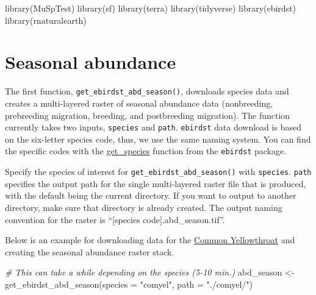 \documentclass[
]{book}
\newenvironment{Shaded}{\begin{snugshade}}{\end{snugshade}}
\newcommand{\AttributeTok}[1]{\textcolor[rgb]{0.77,0.63,0.00}{#1}}
\newcommand{\CommentTok}[1]{\textcolor[rgb]{0.56,0.35,0.01}{\textit{#1}}}
\newcommand{\FunctionTok}[1]{\textcolor[rgb]{0.00,0.00,0.00}{#1}}
\newcommand{\NormalTok}[1]{#1}
\newcommand{\OtherTok}[1]{\textcolor[rgb]{0.56,0.35,0.01}{#1}}
\newcommand{\StringTok}[1]{\textcolor[rgb]{0.31,0.60,0.02}{#1}}
\begin{document}
\begin{Shaded}
\begin{Highlighting}[]
\FunctionTok{library}\NormalTok{(MuSpTest)}
\FunctionTok{library}\NormalTok{(sf)}
\FunctionTok{library}\NormalTok{(terra)}
\FunctionTok{library}\NormalTok{(tidyverse)}
\FunctionTok{library}\NormalTok{(ebirdst)}
\FunctionTok{library}\NormalTok{(rnaturalearth)}
\end{Highlighting}
\end{Shaded}

\hypertarget{seasonal-abundance}{%
\section{Seasonal abundance}\label{seasonal-abundance}}

The first function, \texttt{get\_ebirdst\_abd\_season()}, downloads species data and creates a multi-layered raster of seasonal abundance data (nonbreeding, prebreeding migration, breeding, and postbreeding migration). The function currently takes two inputs, \texttt{species} and \texttt{path}. \texttt{ebirdst} data download is based on the six-letter species code, thus, we use the same naming system. You can find the specific codes with the \href{https://rdrr.io/github/CornellLabofOrnithology/ebirdst/man/get_species.html}{get\_species} function from the \texttt{ebirdst} package.

Specify the species of interest for \texttt{get\_ebirdst\_abd\_season()} with \texttt{species}. \texttt{path} specifies the output path for the single multi-layered raster file that is produced, with the default being the current directory. If you want to output to another directory, make sure that directory is already created. The output naming convention for the raster is ``{[}species code{]}.abd\_season.tif''.

Below is an example for downloading data for the \href{https://ebird.org/species/comyel}{Common Yellowthroat} and creating the seasonal abundance raster stack.

\begin{Shaded}
\begin{Highlighting}[]
\CommentTok{\# This can take a while depending on the species (5{-}10 min.)}
\NormalTok{abd\_season }\OtherTok{\textless{}{-}} \FunctionTok{get\_ebirdst\_abd\_season}\NormalTok{(}\AttributeTok{species =} \StringTok{"comyel"}\NormalTok{, }\AttributeTok{path =} \StringTok{"./comyel/"}\NormalTok{)}
\end{Highlighting}
\end{Shaded}
\end{document}
